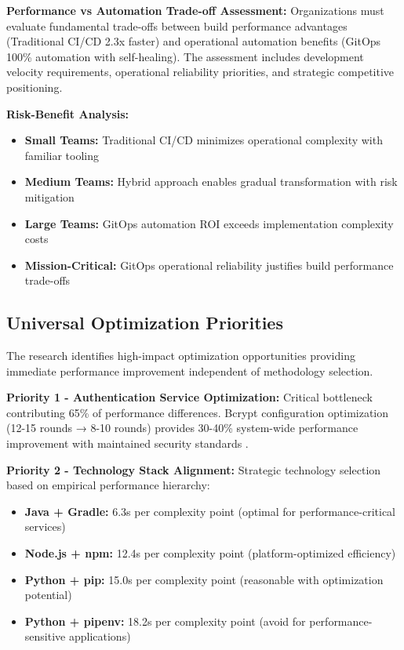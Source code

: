 \textbf{Performance vs Automation Trade-off Assessment:}
Organizations must evaluate fundamental trade-offs between build performance advantages (Traditional CI/CD 2.3x faster) and operational automation benefits (GitOps 100\% automation with self-healing). The assessment includes development velocity requirements, operational reliability priorities, and strategic competitive positioning.

\textbf{Risk-Benefit Analysis:}
\begin{itemize}
\item \textbf{Small Teams:} Traditional CI/CD minimizes operational complexity with familiar tooling
\item \textbf{Medium Teams:} Hybrid approach enables gradual transformation with risk mitigation
\item \textbf{Large Teams:} GitOps automation ROI exceeds implementation complexity costs
\item \textbf{Mission-Critical:} GitOps operational reliability justifies build performance trade-offs
\end{itemize}

\subsection{Universal Optimization Priorities}
\label{subsec:optimization_priorities}

The research identifies high-impact optimization opportunities providing immediate performance improvement independent of methodology selection.

\textbf{Priority 1 - Authentication Service Optimization:}
Critical bottleneck contributing 65\% of performance differences. Bcrypt configuration optimization (12-15 rounds → 8-10 rounds) provides 30-40\% system-wide performance improvement with maintained security standards \cite{bcrypt_performance}.

\textbf{Priority 2 - Technology Stack Alignment:}
Strategic technology selection based on empirical performance hierarchy:
\begin{itemize}
\item \textbf{Java + Gradle:} 6.3s per complexity point (optimal for performance-critical services)
\item \textbf{Node.js + npm:} 12.4s per complexity point (platform-optimized efficiency)
\item \textbf{Python + pip:} 15.0s per complexity point (reasonable with optimization potential)
\item \textbf{Python + pipenv:} 18.2s per complexity point (avoid for performance-sensitive applications)
\end{itemize}

